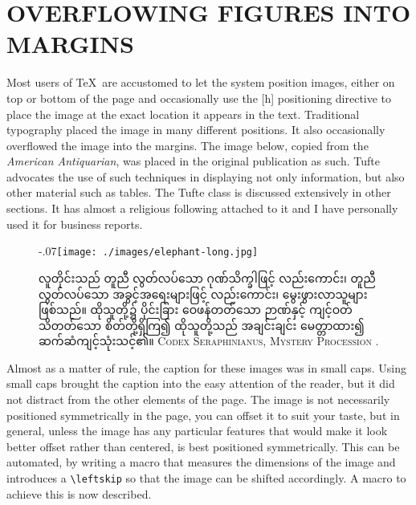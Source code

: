 \chapter[Overflowing Figures into Margins]{OVERFLOWING FIGURES INTO MARGINS}

Most users of \TeX\ are accustomed to let the system position images, either on top or bottom of the page and occasionally use the [h] positioning directive to place the image at the exact location it appears in the text. Traditional typography placed the image in many different positions. It also occasionally overflowed the image into the margins. The image below, copied from the \textit{American Antiquarian}, was placed in the original publication as such. Tufte advocates the use of such techniques in displaying not only information, but also other material such as tables. The Tufte class is discussed extensively in other sections. It has almost a religious following attached to it and I have personally used it for business reports. \citep{seraphini}

\begin{figure}[htbp]
\leftskip-.07\textwidth\texttt{[image: ./images/elephant-long.jpg]}\par

\begin{center}
\ifdefined\myanmar

လူတိုင်းသည် တူညီ လွတ်လပ်သော ဂုဏ်သိက္ခါဖြင့် လည်းကောင်း၊ တူညီလွတ်လပ်သော အခွင့်အရေးများဖြင့် လည်းကောင်း၊ မွေးဖွားလာသူများ ဖြစ်သည်။ ထိုသူတို့၌ ပိုင်းခြား ဝေဖန်တတ်သော ဉာဏ်နှင့် ကျင့်ဝတ် သိတတ်သော စိတ်တို့ရှိကြ၍ ထိုသူတို့သည် အချင်းချင်း မေတ္တာထား၍ ဆက်ဆံကျင့်သုံးသင့်၏။
\fi
\protect\textsc{Codex Seraphinianus, Mystery Procession \protect\citep{seraphini}}.
\end{center}
\end{figure}

Almost as a matter of rule, the caption for these images was in small caps. Using small caps brought the caption into the easy attention of the reader, but it did not distract from the other elements of the page.
The image is not necessarily positioned symmetrically in the page, you can offset it to suit your taste, but in general, unless the image has any particular features that would make it look better offset rather than centered, is best positioned symmetrically. This can be automated, by writing a macro that measures the dimensions of the image and introduces a \verb+\leftskip+ so that the image can be shifted accordingly. A macro to achieve this is now described.


